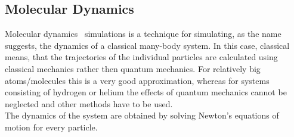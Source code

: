 \documentclass[12pt]{article}
\begin{document}
\subsection{Molecular Dynamics}
Molecular dynamics~\cite{Frenkel2001} simulations is a technique for simulating, as the name suggests, the dynamics of a classical many-body system. In this case,
classical means, that the trajectories of the individual particles are calculated using classical mechanics rather then quantum mechanics. For
relatively big atoms/molecules this is a very good approximation, whereas for systems consisting of hydrogen or helium the effects of quantum
mechanics cannot be neglected and other methods have to be used.\\
The dynamics of the system are obtained by solving Newton's equations of motion for every particle. 
\end{document}
